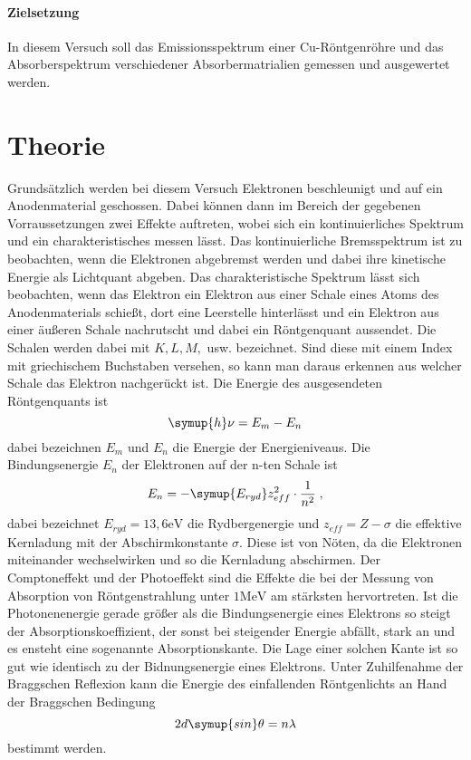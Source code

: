 
\paragraph{Zielsetzung}
In diesem Versuch soll das Emissionsspektrum einer Cu-Röntgenröhre und
das Absorberspektrum verschiedener Absorbermatrialien gemessen und ausgewertet
werden.

\section{Theorie}
\label{sec:Theorie}
Grundsätzlich werden bei diesem Versuch Elektronen beschleunigt und auf ein
Anodenmaterial geschossen. Dabei können dann im Bereich der gegebenen Vorraussetzungen
zwei Effekte auftreten, wobei sich ein kontinuierliches Spektrum und ein
charakteristisches messen lässt. Das kontinuierliche Bremsspektrum ist zu
beobachten, wenn die Elektronen abgebremst werden und dabei ihre kinetische
Energie als Lichtquant abgeben. Das charakteristische Spektrum lässt sich beobachten,
wenn das Elektron ein Elektron aus einer Schale eines Atoms des Anodenmaterials
schießt, dort eine Leerstelle hinterlässt und ein Elektron aus einer äußeren Schale
nachrutscht und dabei ein Röntgenquant aussendet. Die Schalen werden dabei mit
$K,L,M,$ usw. bezeichnet. Sind diese mit einem Index mit griechischem Buchstaben versehen,
so kann man daraus erkennen aus welcher Schale das Elektron nachgerückt ist.
Die Energie des ausgesendeten Röntgenquants ist
\begin{equation}
  \symup{h} \nu = E_m - E_n
  \label{eqn:erq}
\end{equation}
dabei bezeichnen $E_m$ und $E_n$ die Energie der Energieniveaus.
Die Bindungsenergie $E_n$ der Elektronen auf der n-ten Schale ist
\begin{equation}
  E_n = -\symup{E_{ryd}} z_{eff}^2 \cdot \frac{1}{n^2} \; ,
  \label{eqn:be}
\end{equation}
dabei bezeichnet $E_{ryd} = 13,6 \si{\eV}$ die Rydbergenergie und
$z_{eff} = Z - \sigma $ die effektive Kernladung mit der Abschirmkonstante $\sigma$.
Diese ist von Nöten, da die Elektronen miteinander wechselwirken und so die
Kernladung abschirmen.
Der Comptoneffekt und der Photoeffekt sind die Effekte die bei der Messung von
Absorption von Röntgenstrahlung unter $ 1 \si{\mega \eV}$ am stärksten
hervortreten. Ist die Photonenenergie gerade größer als die Bindungsenergie eines
Elektrons so steigt der Absorptionskoeffizient, der sonst bei steigender Energie
abfällt, stark an und es ensteht eine sogenannte Absorptionskante. Die Lage einer
solchen Kante ist so gut wie identisch zu der Bidnungsenergie eines Elektrons.
Unter Zuhilfenahme der Braggschen Reflexion kann die Energie des einfallenden
Röntgenlichts an Hand der Braggschen Bedingung
\begin{equation}
  2 d \symup{sin} \theta = n \lambda
  \label{eqn:bragg}
\end{equation}
bestimmt werden.
